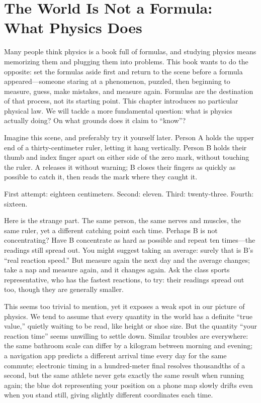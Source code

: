 \chapter{The World Is Not a Formula: What Physics Does}

Many people think physics is a book full of formulas, and studying physics means memorizing them and plugging them into problems. This book wants to do the opposite: set the formulas aside first and return to the scene before a formula appeared---someone staring at a phenomenon, puzzled, then beginning to measure, guess, make mistakes, and measure again. Formulas are the destination of that process, not its starting point. This chapter introduces no particular physical law. We will tackle a more fundamental question: what is physics actually doing? On what grounds does it claim to ``know''?


Imagine this scene, and preferably try it yourself later. Person A holds the upper end of a thirty-centimeter ruler, letting it hang vertically. Person B holds their thumb and index finger apart on either side of the zero mark, without touching the ruler. A releases it without warning; B closes their fingers as quickly as possible to catch it, then reads the mark where they caught it.

First attempt: eighteen centimeters. Second: eleven. Third: twenty-three. Fourth: sixteen.

Here is the strange part. The same person, the same nerves and muscles, the same ruler, yet a different catching point each time. Perhaps B is not concentrating? Have B concentrate as hard as possible and repeat ten times---the readings still spread out. You might suggest taking an average: surely that is B's ``real reaction speed.'' But measure again the next day and the average changes; take a nap and measure again, and it changes again. Ask the class sports representative, who has the fastest reactions, to try: their readings spread out too, though they are generally smaller.

This seems too trivial to mention, yet it exposes a weak spot in our picture of physics. We tend to assume that every quantity in the world has a definite ``true value,'' quietly waiting to be read, like height or shoe size. But the quantity ``your reaction time'' seems unwilling to settle down. Similar troubles are everywhere: the same bathroom scale can differ by a kilogram between morning and evening; a navigation app predicts a different arrival time every day for the same commute; electronic timing in a hundred-meter final resolves thousandths of a second, but the same athlete never gets exactly the same result when running again; the blue dot representing your position on a phone map slowly drifts even when you stand still, giving slightly different coordinates each time.

